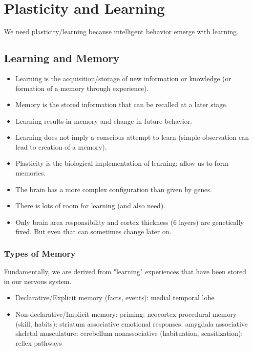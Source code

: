 \documentclass[main]{subfiles}
\begin{document}

\section{Plasticity and Learning}
We need plasticity/learning because intelligent behavior emerge with learning.

\subsection{Learning and Memory}
\begin{itemize}[noitemsep,nolistsep]
	\item Learning is the acquisition/storage of new information or knowledge (or formation of a memory through experience).
	\item Memory is the stored information that can be recalled at a later stage.
	\item Learning results in memory and change in future behavior.
	\item Learning does not imply a conscious attempt to learn (simple observation can lead to creation of a memory).
	\item Plasticity is  the biological implementation of learning: allow us to form memories.
	\item The brain has a more complex configuration than given by genes.
	\item There is lots of room for learning (and also need).
	\item Only brain area responsibility and cortex thickness (6 layers) are genetically fixed. But even that can sometimes change later on.
\end{itemize}

\subsubsection{Types of Memory}
Fundamentally, we are derived from "learning" experiences that have been stored in our nervous system.

\begin{itemize}
	\item Declarative/Explicit memory (facts, events): medial temporal lobe
	\item Non-declarative/Implicit memory:
	\subitem priming: neocortex
	\subitem procedural memory (skill, habits): striatum
	\subitem associative emotional responses: amygdala
	\subitem associative skeletal musculature: cerebellum
	\subitem nonassociative (habituation, sensitization): reflex pathways
\end{itemize}
\end{document}
